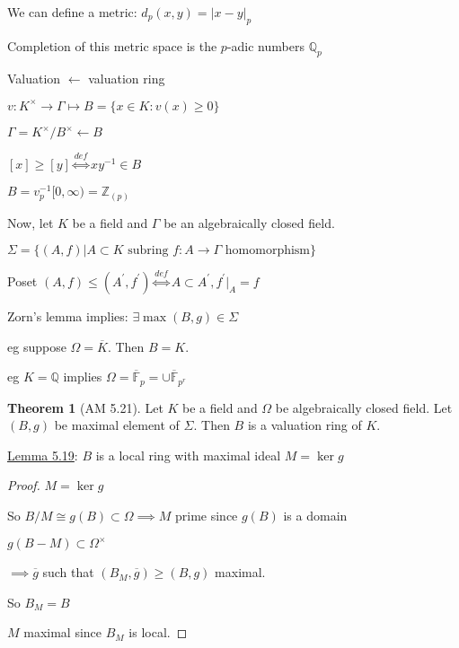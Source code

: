 \documentclass{article}
\theoremstyle{definition}
\newtheorem{theorem}{Theorem}
\begin{document}
We can define a metric: \(d_p(x,y) = \vert x - y \vert_p\)

Completion of this metric space is the \(p\)-adic numbers \(\mathbb{Q}_p\) 

Valuation \(\longleftarrow\) valuation ring

\(v: K^{\times} \to \Gamma \mapsto B = \{ x\in K : v(x) \geq 0\} \) 

\(\Gamma = K^\times / B^\times \leftarrow B\) 

\([x] \geq [y] \overset{def}{\iff} xy^{-1} \in B \)

\(B = v_p ^{-1} [0, \infty) = \mathbb{Z}_{(p)}\) 

Now, let \(K\) be a field and \(\Gamma\) be an algebraically closed field.

\(\Sigma = \{ (A,f) | A \subset K \text{ subring } f:A \to \Gamma \text{ homomorphism} \} \) 

Poset \((A,f) \leq (A^{\prime} ,f^{\prime} ) \overset{def}{\iff} A \subset A^{\prime} , f^{\prime} |_A = f \) 


Zorn's lemma implies: \(\exists \max (B,g)\in \Sigma\)

eg suppose \(\Omega = \overline{K}\). Then \(B=K\).

eg \(K=\mathbb{Q}\) implies \(\Omega = \overline{\mathbb{F}}_p = \cup \overline{\mathbb{F}}_{p^r}\)  

\begin{theorem}
    [AM 5.21]

    Let \(K\) be a field and \(\Omega\) be algebraically closed field. Let \((B,g)\) be maximal element of \(\Sigma\). Then \(B\) is a valuation ring of \(K\).  
\end{theorem}

\underline{Lemma 5.19}: \(B\) is a local ring with maximal ideal \(M = \ker g\)

\begin{proof}
    \(M = \ker g\)
    
    So \(B / M \cong g(B) \subset \Omega \implies M\) prime since \(g(B)\) is a domain
    
    \(g(B-M) \subset \Omega ^ \times \) 

    \(\implies \overline{g} \) such that \((B_M, \overline{g}) \geq (B,g)\) maximal.
    
    So \(B_M = B\)
    
    \(M\) maximal since \(B_M\) is local.
    
\end{proof}
\end{document}

